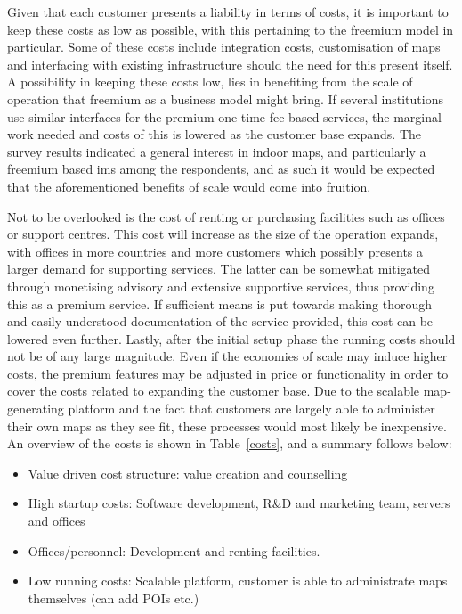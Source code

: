 Given that each customer presents a liability in terms of costs, it is important to keep these costs as low as possible, with this pertaining to the freemium model in particular. Some of these costs include integration costs, customisation of maps and interfacing with existing infrastructure should the need for this present itself. A possibility in keeping these costs low, lies in benefiting from the scale of operation that freemium as a business model might bring. If several institutions use similar interfaces for the premium one-time-fee based services, the marginal work needed and costs of this is lowered as the customer base expands. The survey results indicated a general interest in indoor maps, and particularly a freemium based \gls{ims} among the respondents, and as such it would be expected that the aforementioned benefits of scale would come into fruition.


Not to be overlooked is the cost of renting or purchasing facilities such as offices or support centres. This cost will increase as the size of the operation expands, with offices in more countries and more customers which possibly presents a larger demand for supporting services. The latter can be somewhat mitigated through monetising advisory and extensive supportive services, thus providing this as a premium service. If sufficient means is put towards making thorough and easily understood documentation of the service provided, this cost can be lowered even further. Lastly, after the initial setup phase the running costs should not be of any large magnitude. Even if the economies of scale may induce higher costs, the premium features may be adjusted in price or functionality in order to cover the costs related to expanding the customer base. Due to the scalable map-generating platform and the fact that customers are largely able to administer their own maps as they see fit, these processes would most likely be inexpensive. An overview of the costs is shown in Table~\ref{costs}, and a summary follows below:


\begin{itemize}
    \item Value driven cost structure: value creation and counselling
    \item High startup costs: Software development, R\&D and marketing team, servers and offices
    \item Offices/personnel: Development and renting facilities.
    \item Low running costs: Scalable platform, customer is able to administrate maps themselves (can add POIs etc.)
\end{itemize}

